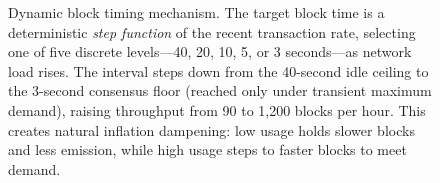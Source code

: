 \begin{figure}[ht]
\caption{Dynamic block timing mechanism. The target block time is a
deterministic \emph{step function} of the recent transaction rate, selecting
one of five discrete levels---40, 20, 10, 5, or 3 seconds---as network load
rises. The interval steps down from the 40-second idle ceiling to the
3-second consensus floor (reached only under transient maximum demand),
raising throughput from 90 to 1{,}200 blocks per hour. This creates natural
inflation dampening: low usage holds slower blocks and less emission, while
high usage steps to faster blocks to meet demand.}
\label{fig:dynamic-timing}
\end{figure}
